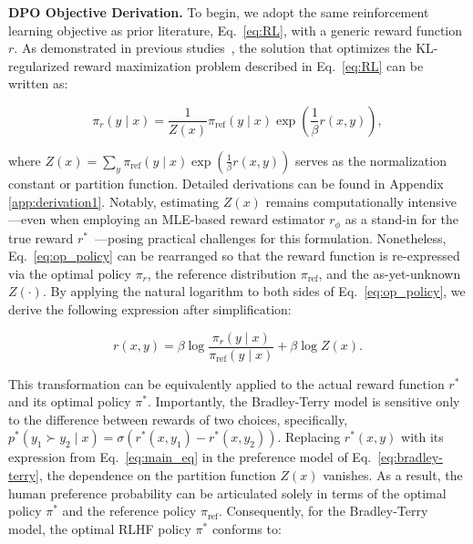 \textbf{DPO Objective Derivation.} To begin, we adopt the same reinforcement learning objective as prior literature, Eq.~\ref{eq:RL}, with a generic reward function $r$. As demonstrated in previous studies~\citep{peters2007reinforcement, peng2019advantage, korbak2022reinforcement, go2023aligning}, the solution that optimizes the KL-regularized reward maximization problem described in Eq.~\ref{eq:RL} can be written as:

\begin{equation}\label{eq:op_policy}
    \pi_r(y\mid x) = \frac{1}{Z(x)}\pi_\text{ref}(y\mid x)\exp\left(\frac{1}{\beta}r(x, y)\right),
\end{equation}

where $Z(x) = \sum_{y}\pi_\text{ref}(y\mid x)\exp\left(\frac{1}{\beta}r(x, y)\right)$ serves as the normalization constant or partition function. Detailed derivations can be found in Appendix \ref{app:derivation1}. Notably, estimating $Z(x)$ remains computationally intensive—even when employing an MLE-based reward estimator $r_{\phi}$ as a stand-in for the true reward $r^*$~\citep{korbak2022reinforcement, go2023aligning}—posing practical challenges for this formulation. Nonetheless, Eq.~\ref{eq:op_policy} can be rearranged so that the reward function is re-expressed via the optimal policy $\pi_r$, the reference distribution $\pi_\text{ref}$, and the as-yet-unknown $Z(\cdot)$. By applying the natural logarithm to both sides of Eq.~\ref{eq:op_policy}, we derive the following expression after simplification:

\begin{equation}\label{eq:main_eq}
    r(x,y) = \beta \log \frac{\pi_r(y\mid x)}{\pi_\text{ref}(y\mid x)} + \beta \log Z(x).
\end{equation}

This transformation can be equivalently applied to the actual reward function $r^*$ and its optimal policy $\pi^*$. Importantly, the Bradley-Terry model is sensitive only to the difference between rewards of two choices, specifically, ${p^*(y_1 \succ y_2 \mid x) = \sigma(r^*(x, y_1) - r^*(x, y_2))}$. Replacing $r^*(x, y)$ with its expression from Eq.~\ref{eq:main_eq} in the preference model of Eq.~\ref{eq:bradley-terry}, the dependence on the partition function $Z(x)$ vanishes. As a result, the human preference probability can be articulated solely in terms of the optimal policy $\pi^*$ and the reference policy $\pi_\text{ref}$. Consequently, for the Bradley-Terry model, the optimal RLHF policy $\pi^*$ conforms to:

